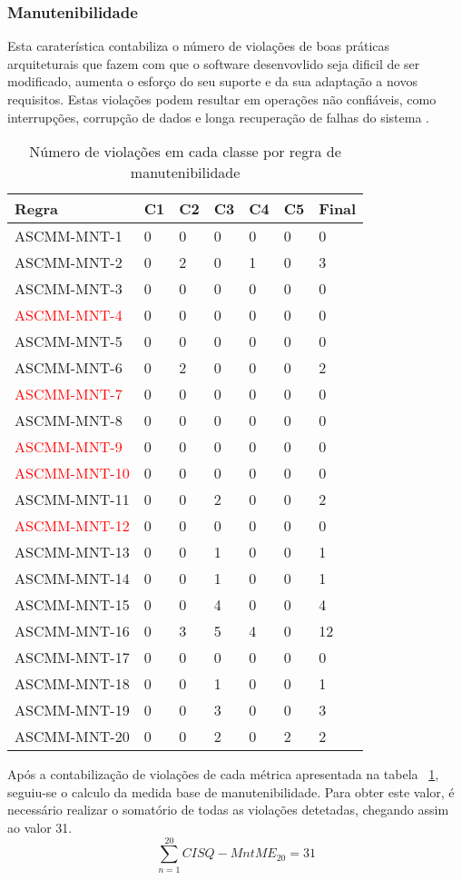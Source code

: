 \documentclass[openany,10pt,a4paper]{article}
\begin{document}
\subsubsection{Manutenibilidade}
Esta caraterística contabiliza o número de violações de boas práticas arquiteturais que fazem com que o software desenvovlido seja dificil de ser modificado, aumenta o esforço do seu suporte e da sua adaptação a novos requisitos. Estas violações podem resultar em operações não confiáveis, como interrupções, corrupção de dados e longa recuperação de falhas do sistema \cite{OMG_Maintainability}.

	\begin{longtable}{p{1.2in}|p{0.28in}|p{0.28in}|p{0.28in}|p{0.28in}|p{0.28in}|p{0.35in}}
		\caption{Número de violações em cada classe por regra de manutenibilidade}
		\label{table_manutenibilidade}
		\endhead
		\hline
		\textbf{Regra} & \textbf{C1} & \textbf{C2} & \textbf{C3} & \textbf{C4} & \textbf{C5} & \textbf{Final} \\ \hline
		ASCMM-MNT-1 & 0 & 0 & 0 & 0 & 0 & 0 \\ \hline
		ASCMM-MNT-2 & 0 & 2 & 0 & 1 & 0 & 3 \\ \hline
		ASCMM-MNT-3 & 0 & 0 & 0 & 0 & 0 & 0 \\ \hline
		\textcolor{red}{ASCMM-MNT-4} & 0 & 0 & 0 & 0 & 0 & 0 \\ \hline
		ASCMM-MNT-5 & 0 & 0 & 0 & 0 & 0 & 0 \\ \hline
		ASCMM-MNT-6 & 0 & 2 & 0 & 0 & 0 & 2 \\ \hline
		\textcolor{red}{ASCMM-MNT-7} & 0 & 0 & 0 & 0 & 0 & 0 \\ \hline
		ASCMM-MNT-8 & 0 & 0 & 0 & 0 & 0 & 0 \\ \hline
		\textcolor{red}{ASCMM-MNT-9} & 0 & 0 & 0 & 0 & 0 & 0 \\ \hline
		\textcolor{red}{ASCMM-MNT-10} & 0 & 0 & 0 & 0 & 0 & 0 \\ \hline
		ASCMM-MNT-11 & 0 & 0 & 2 & 0 & 0 & 2 \\ \hline
		\textcolor{red}{ASCMM-MNT-12} & 0 & 0 & 0 & 0 & 0 & 0 \\ \hline
		ASCMM-MNT-13 & 0 & 0 & 1 & 0 & 0 & 1 \\ \hline
		ASCMM-MNT-14 & 0 & 0 & 1 & 0 & 0 & 1 \\ \hline
		ASCMM-MNT-15 & 0 & 0 & 4 & 0 & 0 & 4 \\ \hline
		ASCMM-MNT-16 & 0 & 3 & 5 & 4 & 0 & 12 \\ \hline
		ASCMM-MNT-17 & 0 & 0 & 0 & 0 & 0 & 0 \\ \hline
		ASCMM-MNT-18 & 0 & 0 & 1 & 0 & 0 & 1 \\ \hline
		ASCMM-MNT-19 & 0 & 0 & 3 & 0 & 0 & 3 \\ \hline
		ASCMM-MNT-20 & 0 & 0 & 2 & 0 & 2 & 2 \\ \hline
	\end{longtable}
Após a contabilização de violações de cada métrica apresentada na tabela ~\ref{table_manutenibilidade}, seguiu-se o calculo da medida base de manutenibilidade. Para obter este valor, é necessário realizar o somatório de todas as violações detetadas, chegando assim ao valor 31.
$$\sum_{n=1}^{20} CISQ - MntME_{20} = 31$$
\end{document}

